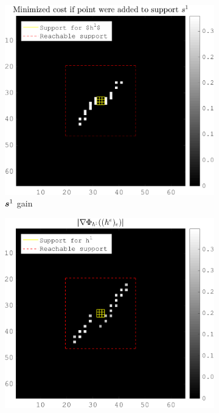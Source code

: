 \begin{figure}[!ht]\centering
	\begin{subfigure}[b]{0.24\textwidth}\centering
	\includegraphics[width=\textwidth]{figures/xp/n1/xp_128x128_sc2_angl1_K3_S3_node1_objmatrix_bestvalues.png}
	\caption{$\bm{s}^1$ gain}
	\end{subfigure}
	\begin{subfigure}[b]{0.24\textwidth}\centering
	\includegraphics[width=\textwidth]{figures/xp/n1/xp_128x128_sc2_angl1_K3_S3_node1_partgrad1_bestvalues.png}

\end{subfigure}
\end{figure}
